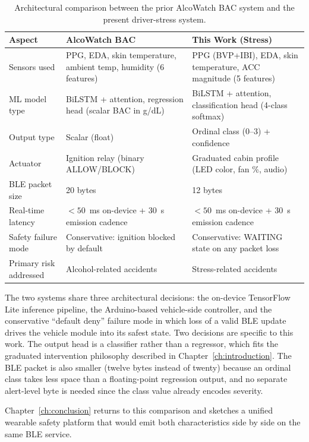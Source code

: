 \begin{table}[H]
\centering
\caption{Architectural comparison between the prior AlcoWatch BAC
system \citep{acn1408} and the present driver-stress system.}
\label{tab:alcowatch-compare}
\small
\begin{tabular}{p{4cm}p{4cm}p{4cm}}
\toprule
\textbf{Aspect} & \textbf{AlcoWatch BAC \citep{acn1408}} &
\textbf{This Work (Stress)} \\
\midrule
Sensors used & PPG, EDA, skin temperature, ambient temp, humidity
(6 features) & PPG (BVP+IBI), EDA, skin temperature, ACC magnitude
(5 features) \\
ML model type & BiLSTM + attention, regression head (scalar BAC
in g/dL) & BiLSTM + attention, classification head (4-class softmax) \\
Output type & Scalar (float) & Ordinal class (0--3) + confidence \\
Actuator & Ignition relay (binary ALLOW/BLOCK) & Graduated cabin profile
(LED color, fan \%, audio) \\
BLE packet size & 20 bytes & 12 bytes \\
Real-time latency & $<50$~ms on-device + 30~s emission cadence &
$<50$~ms on-device + 30~s emission cadence \\
Safety failure mode & Conservative: ignition blocked by default &
Conservative: WAITING state on any packet loss \\
Primary risk addressed & Alcohol-related accidents & Stress-related
accidents \\
\bottomrule
\end{tabular}
\end{table}

The two systems share three architectural decisions: the on-device
TensorFlow Lite inference pipeline, the Arduino-based vehicle-side
controller, and the conservative ``default deny'' failure mode in
which loss of a valid BLE update drives the vehicle module into its
safest state. Two decisions are specific to this work. The output head
is a classifier rather than a regressor, which fits the graduated
intervention philosophy described in Chapter~\ref{ch:introduction}.
The BLE packet is also smaller (twelve bytes instead of twenty) because
an ordinal class takes less space than a floating-point regression
output, and no separate alert-level byte is needed since the class
value already encodes severity.

Chapter~\ref{ch:conclusion} returns to this comparison and sketches
a unified wearable safety platform that would emit both
characteristics side by side on the same BLE service.

